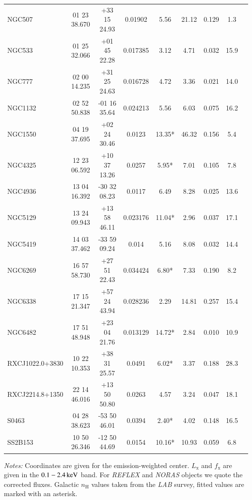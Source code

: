 \documentclass[structabstract]{aa}
\begin{document}
\begin{table}
\begin{threeparttable}
\begin{tabularx}{\textwidth}{Xcccccccl}
NGC507  &  01 23 38.670  &  +33 15 24.93  & 0.01902 & 5.56 & 21.12 & 0.129 & 1.3 \\ 
NGC533  &  01 25 32.066  &  +01 45 22.28  & 0.017385 & 3.12 & 4.71 & 0.032 & 15.9 \\ 
NGC777  &  02 00 14.235  &  +31 25 24.63  & 0.016728 & 4.72 & 3.36 & 0.021 & 14.0 \\
NGC1132  &  02 52 50.838  &  -01 16 35.64  & 0.024213 & 5.56 & 6.03 & 0.075 & 16.2 \\ 
NGC1550  &  04 19 37.695  &  +02 24 30.46  & 0.0123 & 13.35* & 46.32 & 0.156 & 5.4 \\ 
NGC4325  &  12 23 06.592  &  +10 37 13.26  & 0.0257 & 5.95* & 7.01 & 0.105 & 7.8 \\ 
NGC4936  &  13 04 16.392  &  -30 32 08.23  & 0.0117 & 6.49 & 8.28 & 0.025 & 13.6 \\ 
NGC5129  &  13 24 09.943  &  +13 58 46.11  & 0.023176 & 11.04* & 2.96 & 0.037 & 17.1 \\ 
NGC5419  &  14 03 37.462  &  -33 59 09.24  & 0.014 & 5.16 & 8.08 & 0.032 & 14.4 \\ 
NGC6269  &  16 57 58.730  &  +27 51 22.43  & 0.034424 & 6.80* & 7.33 & 0.190 & 8.2 \\ 
NGC6338  &  17 15 21.347  &  +57 24 43.94  & 0.028236 & 2.29 & 14.81 & 0.257 & 15.4 \\ 
NGC6482  &  17 51 48.948  &  +23 04 21.76  & 0.013129 & 14.72* & 2.84 & 0.010 & 10.9 \\ 
RXCJ1022.0+3830  &  10 22 10.353  &  +38 31 25.57  & 0.0491 & 6.02* & 3.37 & 0.188 & 28.3 \\ 
RXCJ2214.8+1350  &  22 14 46.016  &  +13 50 50.80  & 0.0263 & 4.57 & 3.24 & 0.047 & 18.1 \\ 
S0463  &  04 28 38.623  &  -53 50 46.01  & 0.0394 & 2.40* & 4.02 & 0.148 & 16.5 \\ 
SS2B153  &  10 50 26.346  &  -12 50 44.69  & 0.0154 & 10.16* & 10.93 & 0.059 & 6.8 \\ \hline
\end{tabularx}
\label{tab:sample}
 \begin{tablenotes}
\item[] \emph{Notes:} Coordinates are given for the emission-weighted center. $L_{\text{x}}$ and
  $f_{\text{x}}$ are given in the $\unit[0.1-2.4]{keV}$ band. For
  \emph{REFLEX} and \emph{NORAS} objects we quote the corrected
  fluxes. Galactic $n_{\text{H}}$ values taken from the \emph{LAB} survey, fitted
  values are marked with an asterisk.
\end{tablenotes}
\end{threeparttable}
\end{table}
% 
\end{document}
